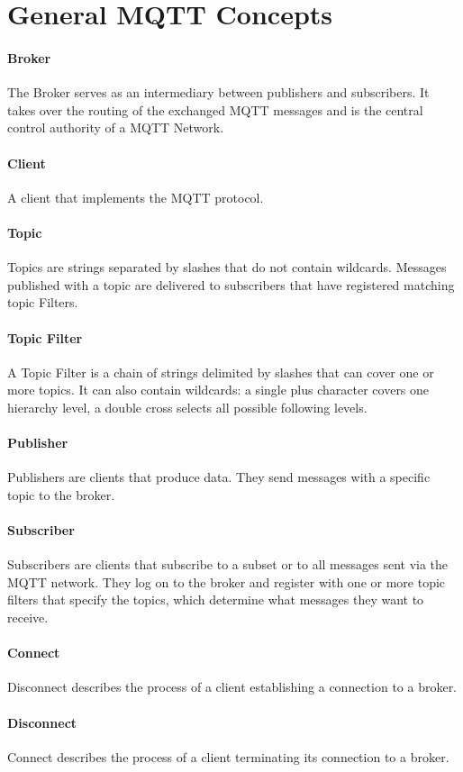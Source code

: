\section{General MQTT Concepts}
\paragraph{Broker}
The Broker serves as an intermediary between publishers and subscribers.
It takes over the routing of the exchanged MQTT messages and is the central control authority of a MQTT Network.
\paragraph{Client}
A client that implements the MQTT protocol. 
\paragraph{Topic}
Topics are strings separated by slashes that do not contain wildcards.
Messages published with a topic are delivered to subscribers that have registered matching topic Filters.
\paragraph{Topic Filter}
A Topic Filter is a chain of strings delimited by slashes that 
can cover one or more topics. 
It can also contain wildcards: a single plus character covers one hierarchy level, a double cross selects all possible following levels.
\paragraph{Publisher}
Publishers are clients that produce data.
They send messages with a specific topic to the broker.
\paragraph{Subscriber}
Subscribers are clients that subscribe to a subset or to all messages sent via the
MQTT network.
They log on to the broker and register with one or more topic filters that specify the topics, which determine what messages they want to receive.
\paragraph{Connect}
Disconnect describes the process of a client establishing a connection to a broker.
\paragraph{Disconnect}
Connect describes the process of a client terminating its connection to a broker.


